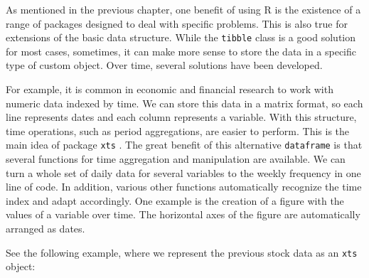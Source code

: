 \documentclass[
  12pt,
]{book}
\begin{document}
As mentioned in the previous chapter, one benefit of using R is the existence of a range of packages designed to deal with specific problems. This is also true for extensions of the basic data structure. While the \texttt{tibble} class is a good solution for most cases, sometimes, it can make more sense to store the data in a specific type of custom object. Over time, several solutions have been developed.

For example, it is common in economic and financial research to work with numeric data indexed by time. We can store this data in a matrix format, so each line represents dates and each column represents a variable. With this structure, time operations, such as period aggregations, are easier to perform. This is the main idea of package \texttt{xts} \citep{R-xts}. The great benefit of this alternative \texttt{dataframe} is that several functions for time aggregation and manipulation are available. We can turn a whole set of daily data for several variables to the weekly frequency in one line of code. In addition, various other functions automatically recognize the time index and adapt accordingly. One example is the creation of a figure with the values of a variable over time. The horizontal axes of the figure are automatically arranged as dates. 

See the following example, where we represent the previous stock data as an \texttt{xts} object: 
\end{document}

